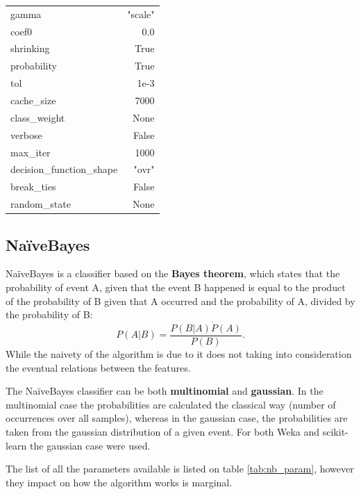 \begin{table}[H]
\begin{subtable}[t]{.5\linewidth}
\begin{tabular}{lr}
            gamma & "scale" \\
            coef0 & 0.0 \\
            shrinking & True \\
            probability & True \\
            tol & 1e-3 \\
            cache\_size & 7000 \\
            class\_weight & None \\
            verbose & False \\
            max\_iter & 1000 \\
            decision\_function\_shape & "ovr" \\
            break\_ties & False \\
            random\_state & None \\\bottomrule
        \end{tabular}
    \end{subtable}%
\end{table}
 
\subsection{NaïveBayes}
NaïveBayes is a classifier based on the \textbf{Bayes theorem}, which states that the probability of event A, given that the event B happened is equal to the product of the probability of B given that A occurred and the probability of A, divided by the probability of B:
\begin{equation}
    P(A|B) = \frac{P(B|A)\dot P(A)}{P(B)}.
\end{equation}
While the naivety of the algorithm is due to it does not taking into consideration the eventual relations between the features.

The NaïveBayes classifier can be both \textbf{multinomial} and \textbf{gaussian}. In the multinomial case the probabilities are calculated the classical way (number of occurrences over all samples), whereas in the gaussian case, the probabilities are taken from the gaussian distribution of a given event. For both Weka and scikit-learn the gaussian case were used.

The list of all the parameters available is listed on table \ref{tab:nb_param}, however they impact on how the algorithm works is marginal. 

